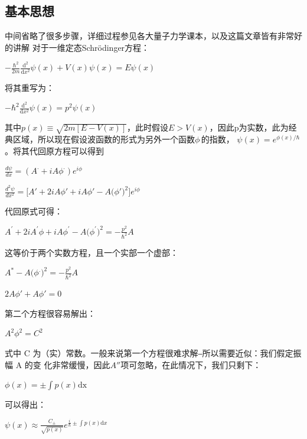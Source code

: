 \documentclass[12pt, a4paper, oneside]{ctexart}
\begin{document}
\begin{spacing}{2.0}
\subsection{基本思想}
中间省略了很多步骤，详细过程参见各大量子力学课本\cite{griffiths_schroeter_2018}，以及这篇文章皆有非常好的讲解\cite{LU2018502}
对于一维定态Schrödinger方程：
\begin{center}
    $\displaystyle - \frac{\hbar^2}{2m} \frac{\mathrm{d}^2}{\mathrm{d}x^2} \psi(x) + V(x) \psi(x) = E \psi(x)\,\!$
\end{center}
将其重写为：
\begin{center}
    $\displaystyle -\hbar^2\frac{\mathrm{d}^2}{\mathrm{d}x^2} \psi(x) =p^2\psi(x)\,\!$
\end{center}
其中$p(x)\equiv \sqrt{2m[E-V(x)]}$，此时假设$E>V(x)$，因此p为实数，此为经典区域，所以现在假设波函数的形式为另外一个函数$\phi\,\!$的指数，
$\displaystyle \psi(x) = e^{\phi(x)/\hbar} \,\!$。将其代回原方程可以得到
\begin{center}
    $\displaystyle\frac{d\psi}{dx}=\left(A^\cdot+i A\phi^\cdot\right)e^{i\phi}$
\end{center}
\begin{center}
    $\displaystyle\frac{d^2\psi}{dx^2}=\bigg[A'+2i A\phi'+i A\phi'-A\Big(\phi'\Big)^2\bigg]e^{i\phi}$
\end{center}
代回原式可得：
\begin{center}
    $\displaystyle A^{'}+2i A^{'}\phi+i A\phi^{'}-A\Big(\phi^{'}\Big)^{2}=-\frac{p^{2}}{\hbar^{2}}A$
\end{center}
这等价于两个实数方程，且一个实部一个虚部：
\begin{center}
    $\displaystyle A^*-A\Big(\phi^.\Big)^2=-\frac{p^2}{\hbar^2}A$
\end{center}
\begin{center}
    $2A\phi'+A\phi'=0$
\end{center}
第二个方程很容易解出：
\begin{center}
    $A^2\phi^2=C^2$
\end{center}
式中 C 为（实）常数。一般来说第一个方程很难求解⎯所以需要近似：我们假定振幅 A 的变
化非常缓慢，因此$A''$项可忽略，在此情况下，我们只剩下：
\begin{center}
    $\displaystyle\phi(x) = \pm \int p(x) \mathrm{dx}$
\end{center}
可以得出：
\begin{center}
    $\displaystyle\psi(x) \approx  \frac{C_{\pm}} {\sqrt{p(x)}}  e^{\frac{i}{\hbar}\pm\int p(x) \mathrm{d}x}$
\end{center}

\end{spacing}
\end{document}
